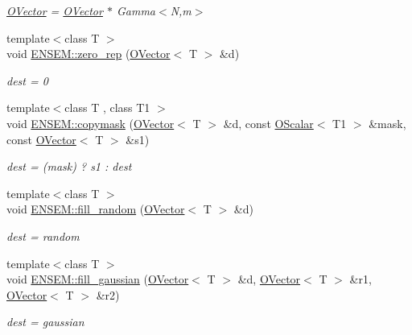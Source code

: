 \begin{DoxyCompactItemize}
\begin{DoxyCompactList}\small\item\em \mbox{\hyperlink{classENSEM_1_1OVector}{O\+Vector}} = \mbox{\hyperlink{classENSEM_1_1OVector}{O\+Vector}} $\ast$ Gamma$<$\+N,m$>$ \end{DoxyCompactList}\item 
{\footnotesize template$<$class T $>$ }\\void \mbox{\hyperlink{group__obsvector_gab00fc89904c43c79298da792136d5b8d}{E\+N\+S\+E\+M\+::zero\+\_\+rep}} (\mbox{\hyperlink{classENSEM_1_1OVector}{O\+Vector}}$<$ T $>$ \&d)
\begin{DoxyCompactList}\small\item\em dest = 0 \end{DoxyCompactList}\item 
{\footnotesize template$<$class T , class T1 $>$ }\\void \mbox{\hyperlink{group__obsvector_ga36fbe4267e04acd96a7558ca09b16912}{E\+N\+S\+E\+M\+::copymask}} (\mbox{\hyperlink{classENSEM_1_1OVector}{O\+Vector}}$<$ T $>$ \&d, const \mbox{\hyperlink{classENSEM_1_1OScalar}{O\+Scalar}}$<$ T1 $>$ \&mask, const \mbox{\hyperlink{classENSEM_1_1OVector}{O\+Vector}}$<$ T $>$ \&s1)
\begin{DoxyCompactList}\small\item\em dest = (mask) ? s1 \+: dest \end{DoxyCompactList}\item 
{\footnotesize template$<$class T $>$ }\\void \mbox{\hyperlink{group__obsvector_ga1ba77da0ffafb0320b14d1dd9fa47179}{E\+N\+S\+E\+M\+::fill\+\_\+random}} (\mbox{\hyperlink{classENSEM_1_1OVector}{O\+Vector}}$<$ T $>$ \&d)
\begin{DoxyCompactList}\small\item\em dest = random \end{DoxyCompactList}\item 
{\footnotesize template$<$class T $>$ }\\void \mbox{\hyperlink{group__obsvector_ga0830d11c7cf74530fe40c56bc99ceb29}{E\+N\+S\+E\+M\+::fill\+\_\+gaussian}} (\mbox{\hyperlink{classENSEM_1_1OVector}{O\+Vector}}$<$ T $>$ \&d, \mbox{\hyperlink{classENSEM_1_1OVector}{O\+Vector}}$<$ T $>$ \&r1, \mbox{\hyperlink{classENSEM_1_1OVector}{O\+Vector}}$<$ T $>$ \&r2)
\begin{DoxyCompactList}\small\item\em dest = gaussian \end{DoxyCompactList}\item 

\end{DoxyCompactItemize}
